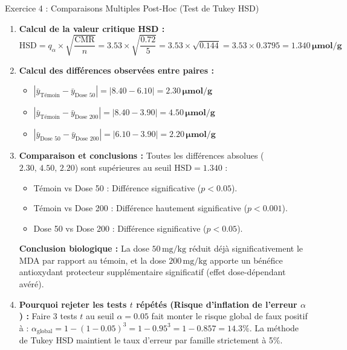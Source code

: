 \documentclass[11pt,a4paper]{article}
\begin{document}
\begin{solutionbox}{Exercice 4 : Comparaisons Multiples Post-Hoc (Test de Tukey HSD)}
\begin{enumerate}[label=\textbf{\alph*.}]
  \item \textbf{Calcul de la valeur critique HSD :}
  \begin{equation*}
    \text{HSD} = q_{\alpha} \times \sqrt{\frac{\text{CMR}}{n}} = 3.53 \times \sqrt{\frac{0.72}{5}} = 3.53 \times \sqrt{0.144} = 3.53 \times 0.3795 = \mathbf{1.340\,\mu\text{mol/g}}
  \end{equation*}

  \item \textbf{Calcul des différences observées entre paires :}
  \begin{itemize}
    \item $|\bar{y}_{\text{Témoin}} - \bar{y}_{\text{Dose 50}}| = |8.40 - 6.10| = \mathbf{2.30\,\mu\text{mol/g}}$
    \item $|\bar{y}_{\text{Témoin}} - \bar{y}_{\text{Dose 200}}| = |8.40 - 3.90| = \mathbf{4.50\,\mu\text{mol/g}}$
    \item $|\bar{y}_{\text{Dose 50}} - \bar{y}_{\text{Dose 200}}| = |6.10 - 3.90| = \mathbf{2.20\,\mu\text{mol/g}}$
  \end{itemize}

  \item \textbf{Comparaison et conclusions :}
  Toutes les différences absolues ($2.30, \, 4.50, \, 2.20$) sont supérieures au seuil $\text{HSD} = 1.340$ :
  \begin{itemize}
    \item Témoin vs Dose 50 : Différence significative ($p < 0.05$).
    \item Témoin vs Dose 200 : Différence hautement significative ($p < 0.001$).
    \item Dose 50 vs Dose 200 : Différence significative ($p < 0.05$).
  \end{itemize}
  \textbf{Conclusion biologique :} La dose $50\,\text{mg/kg}$ réduit déjà significativement le MDA par rapport au témoin, et la dose $200\,\text{mg/kg}$ apporte un bénéfice antioxydant protecteur supplémentaire significatif (effet dose-dépendant avéré).

  \item \textbf{Pourquoi rejeter les tests $t$ répétés (Risque d'inflation de l'erreur $\alpha$) :}
  Faire 3 tests $t$ au seuil $\alpha = 0.05$ fait monter le risque global de faux positif à :
  $\alpha_{\text{global}} = 1 - (1 - 0.05)^3 = 1 - 0.95^3 = 1 - 0.857 = 14.3\%$.
  La méthode de Tukey HSD maintient le taux d'erreur par famille strictement à 5\%.
\end{enumerate}
\end{solutionbox}
\end{document}
